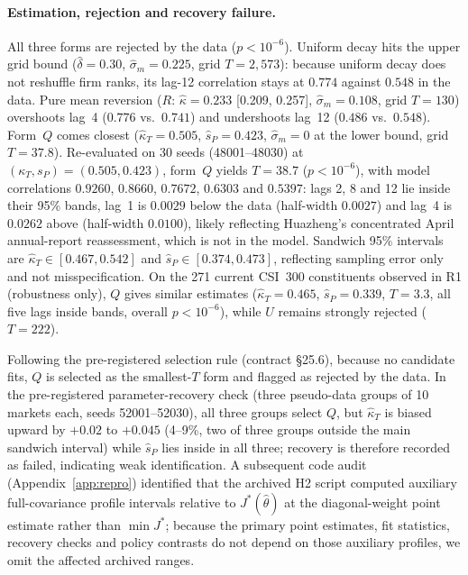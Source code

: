 \documentclass[11pt]{article}
\begin{document}
\paragraph{Estimation, rejection and recovery failure.} All three forms are rejected by the data ($p < 10^{-6}$). Uniform decay hits the upper grid bound ($\hat\delta = 0.30$, $\hat\sigma_m = 0.225$, grid $T = 2{,}573$): because uniform decay does not reshuffle firm ranks, its lag-12 correlation stays at $0.774$ against $0.548$ in the data. Pure mean reversion ($R$: $\hat\kappa = 0.233$ [0.209, 0.257], $\hat\sigma_m = 0.108$, grid $T = 130$) overshoots lag~4 ($0.776$ vs.\ $0.741$) and undershoots lag~12 ($0.486$ vs.\ $0.548$). Form~$Q$ comes closest ($\hat\kappa_T = 0.505$, $\hat s_P = 0.423$, $\hat\sigma_m = 0$ at the lower bound, grid $T = 37.8$). Re-evaluated on 30 seeds (48001--48030) at $(\kappa_T, s_P) = (0.505, 0.423)$, form~$Q$ yields $T = 38.7$ ($p < 10^{-6}$), with model correlations $0.9260$, $0.8660$, $0.7672$, $0.6303$ and $0.5397$: lags 2, 8 and 12 lie inside their 95\% bands, lag~1 is $0.0029$ below the data (half-width $0.0027$) and lag~4 is $0.0262$ above (half-width $0.0100$), likely reflecting Huazheng's concentrated April annual-report reassessment, which is not in the model. Sandwich 95\% intervals are $\hat\kappa_T \in [0.467, 0.542]$ and $\hat s_P \in [0.374, 0.473]$, reflecting sampling error only and not misspecification. On the 271 current CSI~300 constituents observed in R1 (robustness only), $Q$ gives similar estimates ($\hat\kappa_T = 0.465$, $\hat s_P = 0.339$, $T = 3.3$, all five lags inside bands, overall $p < 10^{-6}$), while $U$ remains strongly rejected ($T = 222$).

Following the pre-registered selection rule (contract \S25.6), because no candidate fits, $Q$ is selected as the smallest-$T$ form and flagged as rejected by the data. In the pre-registered parameter-recovery check (three pseudo-data groups of 10 markets each, seeds 52001--52030), all three groups select $Q$, but $\hat\kappa_T$ is biased upward by $+0.02$ to $+0.045$ (4--9\%, two of three groups outside the main sandwich interval) while $\hat s_P$ lies inside in all three; recovery is therefore recorded as failed, indicating weak identification. A subsequent code audit (Appendix~\ref{app:repro}) identified that the archived H2 script computed auxiliary full-covariance profile intervals relative to $J^*(\hat\theta)$ at the diagonal-weight point estimate rather than $\min J^*$; because the primary point estimates, fit statistics, recovery checks and policy contrasts do not depend on those auxiliary profiles, we omit the affected archived ranges.
\end{document}
